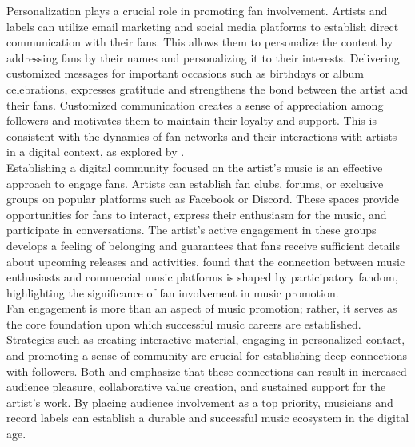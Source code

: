 Personalization plays a crucial role in promoting fan involvement. Artists and labels can utilize email marketing and social media platforms to establish direct communication with their fans. This allows them to personalize the content by addressing fans by their names and personalizing it to their interests. Delivering customized messages for important occasions such as birthdays or album celebrations, expresses gratitude and strengthens the bond between the artist and their fans. Customized communication creates a sense of appreciation among followers and motivates them to maintain their loyalty and support. This is consistent with the dynamics of fan networks and their interactions with artists in a digital context, as explored by \textcite{edlom21}. \\

Establishing a digital community focused on the artist's music is an effective approach to engage fans. Artists can establish fan clubs, forums, or exclusive groups on popular platforms such as Facebook or Discord. These spaces provide opportunities for fans to interact, express their enthusiasm for the music, and participate in conversations. The artist's active engagement in these groups develops a feeling of belonging and guarantees that fans receive sufficient details about upcoming releases and activities. \textcite{lee20} found that the connection between music enthusiasts and commercial music platforms is shaped by participatory fandom, highlighting the significance of fan involvement in music promotion. \\

Fan engagement is more than an aspect of music promotion; rather, it serves as the core foundation upon which successful music careers are established. Strategies such as creating interactive material, engaging in personalized contact, and promoting a sense of community are crucial for establishing deep connections with followers. Both \textcite{edlom21} and \textcite{lee20} emphasize that these connections can result in increased audience pleasure, collaborative value creation, and sustained support for the artist's work. By placing audience involvement as a top priority, musicians and record labels can establish a durable and successful music ecosystem in the digital age. \pagebreak

